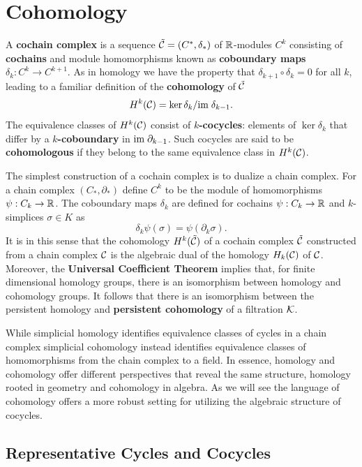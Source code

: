 \section{Cohomology} %
\label{sec:cohomology}

A \textbf{cochain complex} is a sequence $\tilde{\mathcal{C}} = (C^*, \delta_*)$ of $\mathbb{R}$-modules $C^k$ consisting of \textbf{cochains} and module homomorphisms known as \textbf{coboundary maps} $\delta_k:C^k\to C^{k+1}$.
As in homology we have the property that $\delta_{k+1}\circ\delta_k = 0$ for all $k$, leading to a familiar definition of the \textbf{cohomology} of $\tilde{\mathcal{C}}$
\[ H^k(\mathcal{C}) = \ker\delta_k/\mathrm{im}\;\delta_{k-1}.\]
The equivalence classes of $H^k(\mathcal{C})$ consist of \textbf{$k$-cocycles}: elements of $\ker\delta_k$ that differ by a \textbf{$k$-coboundary} in $\mathrm{im}\;\partial_{k-1}$.
Such cocycles are said to be \textbf{cohomologous} if they belong to the same equivalence class in $H^k(\mathcal{C})$.

The simplest construction of a cochain complex is to dualize a chain complex.
For a chain complex $(C_*,\partial_*)$ define $C^k$ to be the module of homomorphisms $\psi:C_k\to\mathbb{R}$.
The coboundary maps $\delta_k$ are defined for cochains $\psi:C_k\to\mathbb{R}$ and $k$-simplices $\sigma\in K$ as
\[\delta_k\psi(\sigma) = \psi(\partial_k\sigma).\]
It is in this sense that the cohomology $H^k(\tilde{\mathcal{C}})$ of a cochain complex $\tilde{\mathcal{C}}$ constructed from a chain complex $\mathcal{C}$ is the algebraic dual of the homology $H_k(\mathcal{C})$ of $\mathcal{C}$.
Moreover, the \textbf{Universal Coefficient Theorem} implies that, for finite dimensional homology groups, there is an isomorphism between homology and cohomology groups.
It follows that there is an isomorphism between the persistent homology and \textbf{persistent cohomology} of a filtration ${\mathcal{K}}$.

While simplicial homology identifies equivalence classes of cycles in a chain complex simplicial cohomology instead identifies equivalence classes of homomorphisms from the chain complex to a field.
In essence, homology and cohomology offer different perspectives that reveal the same structure, homology rooted in geometry and cohomology in algebra.
As we will see the language of cohomology offers a more robust setting for utilizing the algebraic structure of cocycles.

\subsection{Representative Cycles and Cocycles}

